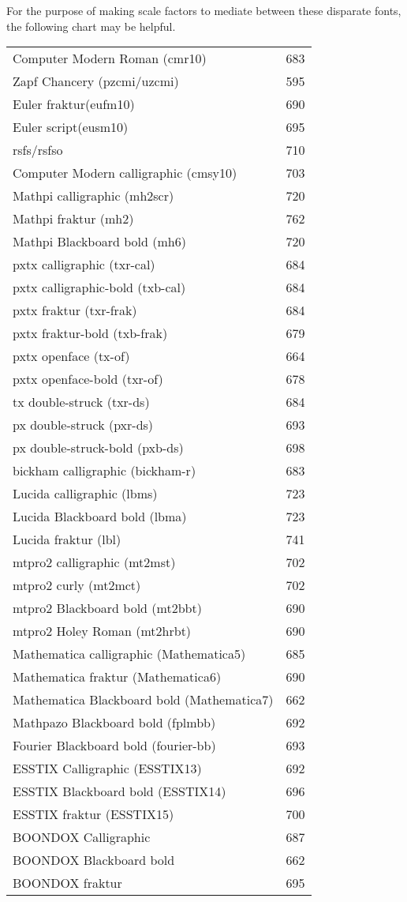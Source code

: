 \documentclass[11pt]{amsart}
\begin{document}
 For the purpose of making scale factors to mediate between these disparate fonts, the following chart may be helpful.

\begin{tabular}{l r}
Computer Modern Roman (cmr10)&683\\
Zapf Chancery (pzcmi/uzcmi)&595\\
Euler fraktur(eufm10)&690\\
Euler script(eusm10)&695\\
rsfs/rsfso&710\\
Computer Modern calligraphic (cmsy10)&703\\
Mathpi calligraphic (mh2scr)&720\\
Mathpi fraktur (mh2)&762\\
Mathpi Blackboard bold (mh6)&720\\
pxtx calligraphic (txr-cal)&684\\
pxtx calligraphic-bold (txb-cal)&684\\
pxtx fraktur (txr-frak)&684\\
pxtx fraktur-bold (txb-frak)&679\\
pxtx openface (tx-of)&664\\
pxtx openface-bold (txr-of)&678\\
tx double-struck (txr-ds)&684\\
px double-struck (pxr-ds)&693\\
px double-struck-bold (pxb-ds)&698\\
bickham calligraphic (bickham-r)&683\\
Lucida calligraphic (lbms)&723\\
Lucida Blackboard bold (lbma)&723\\
Lucida fraktur (lbl)&741\\
mtpro2 calligraphic (mt2mst)&702\\
mtpro2 curly (mt2mct)&702\\
mtpro2 Blackboard bold (mt2bbt)&690\\
mtpro2 Holey Roman (mt2hrbt)&690\\
Mathematica calligraphic (Mathematica5)&685\\
Mathematica fraktur (Mathematica6)&690\\
Mathematica Blackboard bold (Mathematica7)&662\\
Mathpazo Blackboard bold (fplmbb)&692\\
Fourier Blackboard bold (fourier-bb)&693\\
ESSTIX Calligraphic (ESSTIX13)&692\\
ESSTIX Blackboard bold (ESSTIX14)&696\\
ESSTIX fraktur (ESSTIX15)&700\\
BOONDOX Calligraphic &687\\
BOONDOX Blackboard bold &662\\
BOONDOX fraktur &695
\end{tabular}
\end{document}
